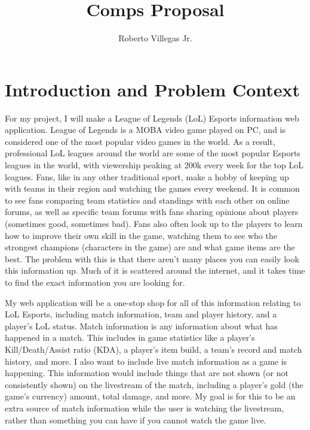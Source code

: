 \documentclass[10pt,twocolumn]{article}
\title{Comps Proposal}
\author{Roberto Villegas Jr.}
\affiliation{Occidental College}
\begin{document}
\maketitle

\section{Introduction and Problem Context} %

For my project, I will make a League of Legends (LoL) Esports information web application.
League of Legends is a MOBA video game played on PC, and is considered one of the most popular video games in the world.
As a result, professional LoL leagues around the world are some of the most popular Esports leagues in the world, with viewership peaking at 200k every week for the top LoL leagues.
Fans, like in any other traditional sport, make a hobby of keeping up with teams in their region and watching the games every weekend.
It is common to see fans comparing team statistics and standings with each other on online forums, as well as specific team forums with fans sharing opinions about players (sometimes good, sometimes bad). 
Fans also often look up to the players to learn how to improve their own skill in the game, watching them to see who the strongest champions (characters in the game) are and what game items are the best.
The problem with this is that there aren't many places you can easily look this information up.
Much of it is scattered around the internet, and it takes time to find the exact information you are looking for.

My web application will be a one-stop shop for all of this information relating to LoL Esports, including match information, team and player history, and a player's LoL status.
Match information is any information about what has happened in a match.
This includes in game statistics like a player's Kill/Death/Assist ratio (KDA), a player's item build, a team's record and match history, and more.
I also want to include live match information as a game is happening.
This information would include things that are not shown (or not consistently shown) on the livestream of the match, including a player's gold (the game's currency) amount, total damage, and more.
My goal is for this to be an extra source of match information while the user is watching the livestream, rather than something you can have if you cannot watch the game live.
\end{document}
